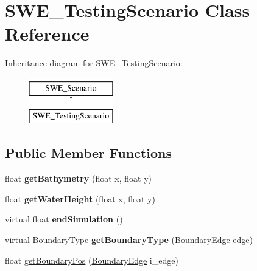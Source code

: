 \hypertarget{classSWE__TestingScenario}{\section{S\-W\-E\-\_\-\-Testing\-Scenario Class Reference}
\label{classSWE__TestingScenario}
}
Inheritance diagram for S\-W\-E\-\_\-\-Testing\-Scenario\-:\begin{figure}[H]
\begin{center}
\leavevmode
\includegraphics[height=2.000000cm]{classSWE__TestingScenario}
\end{center}
\end{figure}
\subsection*{Public Member Functions}
\begin{DoxyCompactItemize}
\item 
\hypertarget{classSWE__TestingScenario_a4e826b2e15bca3776299762349080e94}{float {\bfseries get\-Bathymetry} (float x, float y)}\label{classSWE__TestingScenario_a4e826b2e15bca3776299762349080e94}

\item 
\hypertarget{classSWE__TestingScenario_ab5585f9551a8ddf70cbf34baefb8fcd3}{float {\bfseries get\-Water\-Height} (float x, float y)}\label{classSWE__TestingScenario_ab5585f9551a8ddf70cbf34baefb8fcd3}

\item 
\hypertarget{classSWE__TestingScenario_a83bf319990d977815571c687209a4b0b}{virtual float {\bfseries end\-Simulation} ()}\label{classSWE__TestingScenario_a83bf319990d977815571c687209a4b0b}

\item 
\hypertarget{classSWE__TestingScenario_a920a553d80872ff79ff9d3681653a234}{virtual \hyperlink{SWE__Scenario_8hh_af75d5dd7322fa39ed0af4e7839e600f8}{Boundary\-Type} {\bfseries get\-Boundary\-Type} (\hyperlink{SWE__Scenario_8hh_aa5e01e3f7df312f7b9b0d02521141fcc}{Boundary\-Edge} edge)}\label{classSWE__TestingScenario_a920a553d80872ff79ff9d3681653a234}

\item 
float \hyperlink{classSWE__TestingScenario_acdc9821322f7790358313335f106b67b}{get\-Boundary\-Pos} (\hyperlink{SWE__Scenario_8hh_aa5e01e3f7df312f7b9b0d02521141fcc}{Boundary\-Edge} i\-\_\-edge)
\end{DoxyCompactItemize}


